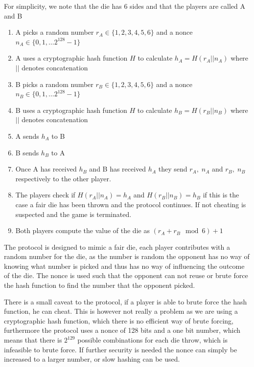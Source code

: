 \documentclass[ twoside,openright,titlepage,numbers=noenddot,headinclude,%
                footinclude=true,cleardoublepage=empty,abstractoff, %
                BCOR=5mm,paper=a4,fontsize=11pt,%
                ngerman,american,%
                ]{scrreprt}
\begin{document}
For simplicity, we note that the die has 6 sides and that the players are called A and B
\begin{enumerate}
  \item A picks a random number $r_A \in \{1,2,3,4,5,6\}$ and a nonce $n_A \in \{0,1,\dots 2^{128}-1\}$
  \item A uses a cryptographic hash function $H$ to calculate $h_A = H(r_A || n_A)$ where $||$ denotes concatenation
  \item B picks a random number $r_B \in \{1,2,3,4,5,6\}$ and a nonce $n_B \in \{0,1,\dots 2^{128}-1\}$
  \item B uses a cryptographic hash function $H$ to calculate $h_B = H(r_B || n_B)$ where $||$ denotes concatenation 
  \item A sends $h_A$ to B
  \item B sends $h_B$ to A
  \item Once A has received $h_B$ and B has received $h_A$ they send $r_A, \; n_A$ and $r_B, \; n_B$ respectively to the other player.
  \item The players check if $H(r_A || n_A) = h_A$ and $H(r_B || n_B) = h_B$ if this is the case a fair die has been thrown and the protocol continues. If not cheating is suspected and the game is terminated.
  \item Both players compute the value of the die as $(r_A + r_B \mod 6) + 1$
\end{enumerate}
The protocol is designed to mimic a fair die, each player contributes with a random number for the die, as the number is random the opponent has no way of knowing what number is picked and thus has no way of influencing the outcome of the die. The nonce is used such that the opponent can not reuse or brute force the hash function to find the number that the opponent picked.

There is a small caveat to the protocol, if a player is able to brute force the hash function, he can cheat. This is however not really a problem as we are using a cryptographic hash function, which there is no efficient way of brute forcing, furthermore the protocol uses a nonce of 128 bits and a one bit number, which means that there is $2^{129}$ possible combinations for each die throw, which is infeasible to brute force. If further security is needed the nonce can simply be increased to a larger number, or slow hashing can be used.
\end{document}
